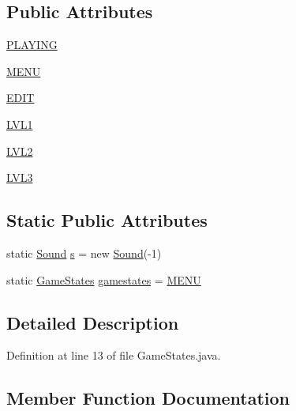 \subsection*{Public Attributes}
\begin{DoxyCompactItemize}
\item 
\hyperlink{enumprogetto_1_1_game_states_ae698cdcd89b599ad8d09e926d96b9bb2}{P\+L\+A\+Y\+I\+NG}
\item 
\hyperlink{enumprogetto_1_1_game_states_a150c8cffaaafc43b40fb13ba79713b81}{M\+E\+NU}
\item 
\hyperlink{enumprogetto_1_1_game_states_a5019c6e9c3451a4b6891c6967bc7c520}{E\+D\+IT}
\item 
\hyperlink{enumprogetto_1_1_game_states_a8fce138902dc10c56947e3a198a82bbc}{L\+V\+L1}
\item 
\hyperlink{enumprogetto_1_1_game_states_aa5497dce22982241ffa3abe28221df31}{L\+V\+L2}
\item 
\hyperlink{enumprogetto_1_1_game_states_a108ed148cd064ece49ce2da94e7eefe8}{L\+V\+L3}
\end{DoxyCompactItemize}
\subsection*{Static Public Attributes}
\begin{DoxyCompactItemize}
\item 
static \hyperlink{classprogetto_1_1_sound}{Sound} \hyperlink{enumprogetto_1_1_game_states_ac579af384655052bc4ffb08687fb02a7}{s} = new \hyperlink{classprogetto_1_1_sound}{Sound}(-\/1)
\item 
static \hyperlink{enumprogetto_1_1_game_states}{Game\+States} \hyperlink{enumprogetto_1_1_game_states_a79680f0d0efb1f11595d5947b42c0c77}{gamestates} = \hyperlink{enumprogetto_1_1_game_states_a150c8cffaaafc43b40fb13ba79713b81}{M\+E\+NU}
\end{DoxyCompactItemize}


\subsection{Detailed Description}


Definition at line 13 of file Game\+States.\+java.



\subsection{Member Function Documentation}
\mbox{\label{enumprogetto_1_1_game_states_a118b00363a0d1055d4b00bb40dd66f34}} 
